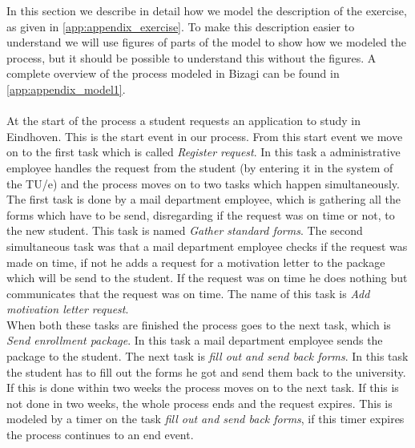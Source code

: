 
In this section we describe in detail how we model the description of the exercise, as given in \autoref{app:appendix_exercise}. To make this description easier to understand we will use figures of parts of the model to show how we modeled the process, but it should be possible to understand this without the figures. A complete overview of the process modeled in Bizagi can be found in \autoref{app:appendix_model1}.\\
\\
At the start of the process a student requests an application to study in Eindhoven. This is the start event in our process. From this start event we move on to the first task which is called \emph{Register request}. In this task a administrative employee handles the request from the student (by entering it in the system of the TU/e) and the process moves on to two tasks which happen simultaneously. \\
The first task is done by a mail department employee, which is gathering all the forms which have to be send, disregarding if the request was on time or not, to the new student. This task is named \emph{Gather standard forms}. The second simultaneous task was that a mail department employee checks if the request was made on time, if not he adds a request for a motivation letter to the package which will be send to the student. If the request was on time he does nothing but communicates that the request was on time. The name of this task is \emph{Add motivation letter request}.\\
When both these tasks are finished the process goes to the next task, which is \emph{Send enrollment package}. In this task a mail department employee sends the package to the student. The next task is \emph{fill out and send back forms}. In this task the student has to fill out the forms he got and send them back to the university. If this is done within two weeks the process moves on to the next task. If this is not done in two weeks, the whole process ends and the request expires. This is modeled by a timer on the task \emph{fill out and send back forms}, if this timer expires the process continues to an end event.\\
